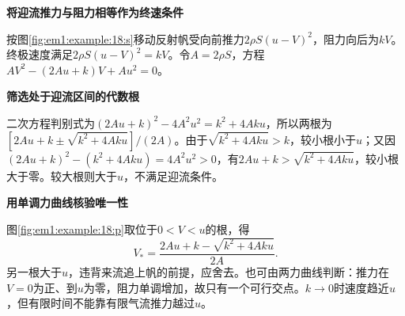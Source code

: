 \begin{solution}\textbf{将迎流推力与阻力相等作为终速条件}\par\nobreak
按图\ref{fig:em1:example:18:s}移动反射帆受向前推力$2\rho S(u-V)^2$，阻力向后为$kV$。终极速度满足$2\rho S(u-V)^2=kV$。令$A=2\rho S$，方程$AV^2-(2Au+k)V+Au^2=0$。



\par\medskip{}\noindent\textbf{筛选处于迎流区间的代数根}\par\nobreak
二次方程判别式为$(2Au+k)^2-4A^2u^2=k^2+4Aku$，所以两根为$[2Au+k\pm\sqrt{k^2+4Aku}]/(2A)$。由于$\sqrt{k^2+4Aku}>k$，较小根小于$u$；又因$(2Au+k)^2-(k^2+4Aku)=4A^2u^2>0$，有$2Au+k>\sqrt{k^2+4Aku}$，较小根大于零。较大根则大于$u$，不满足迎流条件。



\par\medskip{}\noindent\textbf{用单调力曲线核验唯一性}\par\nobreak
图\ref{fig:em1:example:18:p}取位于$0<V<u$的根，得
\[\boxed{V_*=\frac{2Au+k-\sqrt{k^2+4Aku}}{2A}}.\]
另一根大于$u$，违背来流追上帆的前提，应舍去。也可由两力曲线判断：推力在$V=0$为正、到$u$为零，阻力单调增加，故只有一个可行交点。$k\to0$时速度趋近$u$，但有限时间不能靠有限气流推力越过$u$。\end{solution}

